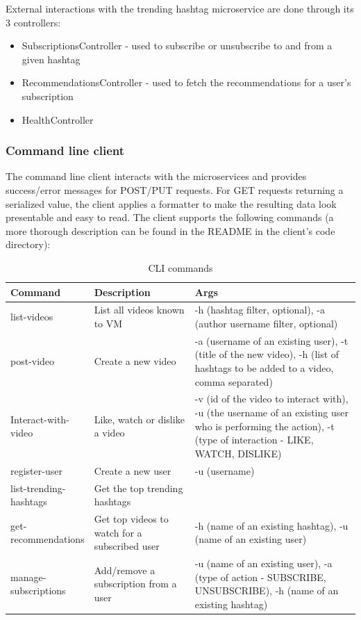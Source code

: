 \documentclass[parskip=full]{article}
\begin{document}
    External interactions with the trending hashtag microservice are done through its 3 controllers:

    \begin{itemize}
        \item SubscriptionsController - used to subscribe or unsubscribe to and from a given hashtag
        \item RecommendationsController - used to fetch the recommendations for a user's subscription
        \item HealthController
    \end{itemize}

    \subsubsection{Command line client}
    The command line client interacts with the microservices and provides success/error messages for POST/PUT requests.
    For GET requests returning a serialized value, the client applies a formatter to make the resulting data look presentable and easy to read.
    The client supports the following commands (a more thorough description can be found in the README in the client's code directory):

    \begin{table}[h]
        \centering
        \begin{tabular}{|p{0.2\linewidth}|p{0.3\linewidth}|p{0.5\linewidth}|}
            \toprule
            \textbf{Command} & \textbf{Description} & \textbf{Args} \\
            \midrule
            list-videos & List all videos known to VM & -h (hashtag filter, optional), -a (author username filter, optional) \\
            post-video & Create a new video & -a (username of an existing user), -t (title of the new video), -h (list of hashtags to be added to a video, comma separated) \\
            Interact-with-video & Like, watch or dislike a video & -v (id of the video to interact with), -u (the username of an existing user who is performing the action), -t (type of interaction - LIKE, WATCH, DISLIKE) \\
            register-user & Create a new user & -u (username) \\
            list-trending-hashtags & Get the top trending hashtags &  \\
            get-recommendations & Get top videos to watch for a subscribed user & -h (name of an existing hashtag), -u (name of an existing user) \\
            manage-subscriptions & Add/remove a subscription from a user & -u (name of an existing user), -a (type of action - SUBSCRIBE, UNSUBSCRIBE), -h (name of an existing hashtag) \\
            \bottomrule
        \end{tabular}
        \caption{CLI commands}
        \label{tab:cli-commands}
    \end{table}
\end{document}
